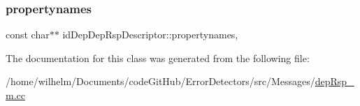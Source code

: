 \subsubsection{\texorpdfstring{propertynames}{propertynames}}
{\footnotesize\ttfamily const char$\ast$$\ast$ id\+Dep\+Dep\+Rsp\+Descriptor\+::propertynames\hspace{0.3cm}{\ttfamily [mutable]}, {\ttfamily [private]}}



The documentation for this class was generated from the following file\+:\begin{DoxyCompactItemize}
\item 
/home/wilhelm/\+Documents/code\+Git\+Hub/\+Error\+Detectors/src/\+Messages/\hyperlink{dep_rsp__m_8cc}{dep\+Rsp\+\_\+m.\+cc}\end{DoxyCompactItemize}

